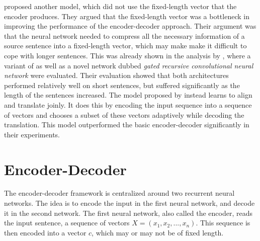 \citep{bahdanau2014neural} proposed another model, which did not use the fixed-length vector that the encoder produces. They argued that the fixed-length vector was a bottleneck in improving the performance of the encoder-decoder approach. Their argument was that the neural network needed to compress all the necessary information of a source sentence into a fixed-length vector, which may make make it difficult to cope with longer sentences. This was already shown in the analysis by \citep{cho2014properties}, where a variant of \citep{cho2014learning} as well as a novel network dubbed \textit{gated recursive convolutional neural network} were evaluated. Their evaluation showed that both architectures performed relatively well on short sentences, but suffered significantly as the length of the sentences increased. The model proposed by \citep{bahdanau2014neural} instead learns to align and translate joinly. It does this by encoding the input sequence into a sequence of vectors and chooses a subset of these vectors adaptively while decoding the translation. This model outperformed the basic encoder-decoder significantly in their experiments.

\section{Encoder-Decoder}
\label{sec:encoder-decoder}
The encoder-decoder framework is centralized around two recurrent neural networks. The idea is to encode the input in the first neural network, and decode it in the second network. The first neural network, also called the encoder, reads the input sentence, a sequence of vectors \(X = (x_{1}, x_{2}, ..., x_{n})\). This sequence is then encoded into a vector \(c\), which may or may not be of fixed length.
